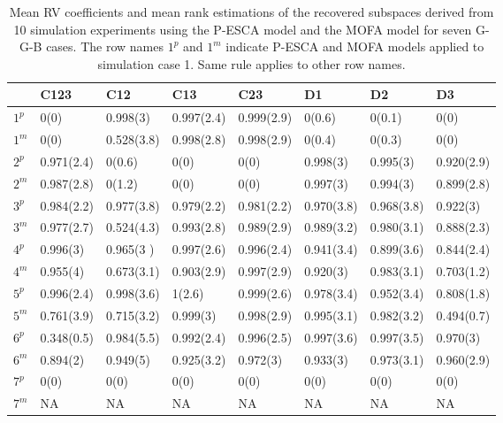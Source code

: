 \begin{table}[htbp]
\small
\centering
\caption{Mean RV coefficients and mean rank estimations of the recovered subspaces derived from 10 simulation experiments using the P-ESCA model and the MOFA model for seven G-G-B cases. The row names $1^p$ and $1^m$ indicate P-ESCA and MOFA models applied to simulation case 1. Same rule applies to other row names.}
\label{chapter5_tab:5}
\begin{tabular}{llllllll}
  \toprule
     & C123 & C12 & C13 & C23 & D1 & D2 & D3 \\
  \midrule
 $1^{p}$ & 0(0)        & 0.998(3) & 0.997(2.4) & 0.999(2.9) & 0(0.6)     & 0(0.1)       & 0(0) \\
 $1^{m}$ & 0(0)        & 0.528(3.8) & 0.998(2.8) & 0.998(2.9) & 0(0.4)     & 0(0.3)       & 0(0)  \\
 \hline
 $2^{p}$ & 0.971(2.4)  & 0(0.6)     & 0(0)       & 0(0)     & 0.998(3) & 0.995(3)     & 0.920(2.9) \\
 $2^{m}$ & 0.987(2.8)  & 0(1.2)     & 0(0)       & 0(0)       & 0.997(3)   & 0.994(3)     & 0.899(2.8) \\
 \hline
 $3^{p}$ & 0.984(2.2)  & 0.977(3.8) & 0.979(2.2) & 0.981(2.2) & 0.970(3.8) & 0.968(3.8)   & 0.922(3) \\
 $3^{m}$ & 0.977(2.7)  & 0.524(4.3) & 0.993(2.8)   & 0.989(2.9) & 0.989(3.2) & 0.980(3.1)   & 0.888(2.3) \\
 \hline
 $4^{p}$ & 0.996(3)    & 0.965(3  ) & 0.997(2.6) & 0.996(2.4) & 0.941(3.4) & 0.899(3.6)   & 0.844(2.4) \\
 $4^{m}$ & 0.955(4)    & 0.673(3.1) & 0.903(2.9) & 0.997(2.9) & 0.920(3) & 0.983(3.1)   & 0.703(1.2)      \\
 \hline
 $5^{p}$ & 0.996(2.4)  & 0.998(3.6) & 1(2.6)     & 0.999(2.6)   & 0.978(3.4) & 0.952(3.4)   & 0.808(1.8)\\
 $5^{m}$ & 0.761(3.9)  & 0.715(3.2) & 0.999(3)   & 0.998(2.9) & 0.995(3.1)   & 0.982(3.2)   & 0.494(0.7)      \\
 \hline
 $6^{p}$ & 0.348(0.5)  & 0.984(5.5) & 0.992(2.4) & 0.996(2.5) & 0.997(3.6) & 0.997(3.5)   & 0.970(3) \\
 $6^{m}$ & 0.894(2)  & 0.949(5) & 0.925(3.2) & 0.972(3)  & 0.933(3) & 0.973(3.1)   & 0.960(2.9) \\
 \hline
 $7^{p}$ & 0(0)        & 0(0)        & 0(0)        & 0(0)        & 0(0)        & 0(0)        & 0(0) \\
 $7^{m}$ & NA          & NA           & NA           & NA         & NA         &NA         & NA \\
  \bottomrule
\end{tabular}
\end{table}

